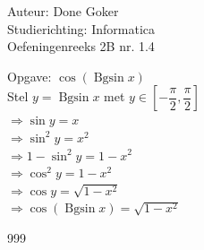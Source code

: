 \documentclass[a4paper]{article}
\begin{document}
  
\noindent \large Auteur: Done Goker \\
\noindent \large Studierichting: Informatica\\
\noindent \large Oefeningenreeks 2B nr. 1.4\\

\medskip

\normalsize

Opgave: $ \cos(\operatorname{Bgsin} x)$ \\

Stel $ y = \operatorname{Bgsin} x$  met $ y \in \left[ -\dfrac{\pi}{2}, \dfrac{\pi}{2}\right]  $  \\

$ \Rightarrow \sin y = x$ \\

$ \Rightarrow \sin^2 y = x^2$ \\

$ \Rightarrow 1 - \sin^2 y = 1 - x^2$ \\

$ \Rightarrow \cos^2 y = 1 - x^2$ \\

$ \Rightarrow \cos y = \sqrt{1 - x^2}$ \\

$ \Rightarrow \cos(\operatorname{Bgsin} x) = \sqrt{1 - x^2}$ \\

\begin{thebibliography}{999}
\end{thebibliography}
\end{document}
